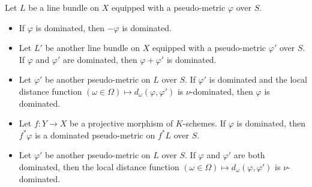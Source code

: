 \documentclass [11pt,reqno]{amsart}
\newcommand{\1}{\mathmybb{1}}
\begin{document}
\begin{proposition}
\label{prop:dominated_pseudo-metric_families}
Let $L$ be a line bundle on $X$ equipped with a pseudo-metric $\varphi$ over $S$. 
\begin{itemize}
	\item[(1)] If $\varphi$ is dominated, then $-\varphi$ is dominated.
	\item[(2)] Let $L'$ be another line bundle on $X$ equipped with a pseudo-metric $\varphi'$ over $S$. If $\varphi$ and $\varphi'$ are dominated, then $\varphi+\varphi'$ is dominated.
	\item[(3)] Let $\varphi'$ be another pseudo-metric on $L$ over $S$. If $\varphi'$ is dominated and the local distance function $(\omega\in\Omega)\mapsto d_{\omega}(\varphi,\varphi')$ is $\nu$-dominated, then $\varphi$ is dominated.
	\item[(4)] Let $f : Y \to X$ be a projective morphism of $K$-schemes. If $\varphi$ is dominated, then $f^{\ast}\varphi$ is a dominated pseudo-metric on $f^{\ast} L$ over $S$.
	\item[(5)] Let $\varphi'$ be another pseudo-metric on $L$ over $S$. If $\varphi$ and $\varphi'$ are both dominated, then the local distance function $(\omega\in\Omega)\mapsto d_{\omega}(\varphi,\varphi')$ is $\nu$-dominated.
\end{itemize}
\end{proposition}
\end{document}
